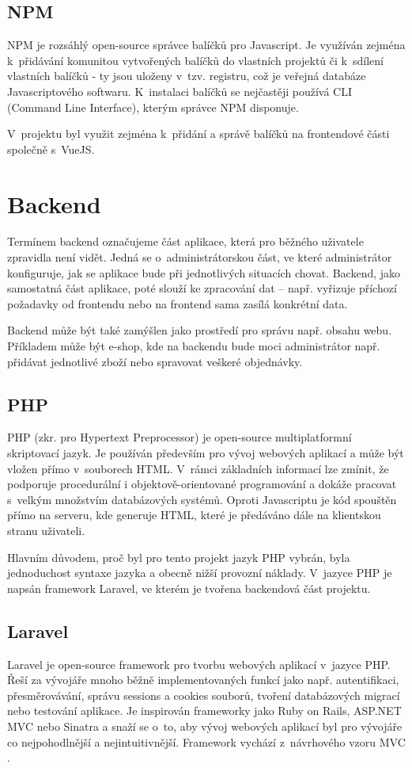 	\subsection{NPM}\label{sec:npm}
	NPM je rozsáhlý open-source správce balíčků pro Javascript. Je využíván zejména k~přidávání komunitou vytvořených balíčků do vlastních projektů či k~sdílení vlastních balíčků - ty jsou uloženy v~tzv. registru, což je veřejná databáze Javascriptového softwaru. K~instalaci balíčků se nejčastěji používá CLI (Command Line Interface), kterým správce NPM disponuje. \cite{NPM}
	
	V~projektu byl využit zejména k~přidání a správě balíčků na frontendové části společně s~VueJS.

\section{Backend}
Termínem backend označujeme část aplikace, která pro běžného uživatele zpravidla není vidět. Jedná se o~administrátorskou část, ve které administrátor konfiguruje, jak se aplikace bude při jednotlivých situacích chovat. Backend, jako samostatná část aplikace, poté slouží ke zpracování dat – např. vyřizuje příchozí požadavky od frontendu nebo na frontend sama zasílá konkrétní data.

Backend může být také zamýšlen jako prostředí pro správu např. obsahu webu. Příkladem může být e-shop, kde na backendu bude moci administrátor např. přidávat jednotlivé zboží nebo spravovat veškeré objednávky.  \cite{BE1}\cite{BE2}
	
	\subsection{PHP}
	PHP (zkr. pro Hypertext Preprocessor) je open-source multiplatformní skriptovací jazyk. Je používán především pro vývoj webových aplikací a může být vložen přímo v~souborech HTML. V~rámci základních informací lze zmínit, že podporuje procedurální i objektově-orientované programování a dokáže pracovat s~velkým množstvím databázových systémů. Oproti Javascriptu je kód spouštěn přímo na serveru, kde generuje HTML, které je předáváno dále na klientskou stranu uživateli. \cite{PHP1}\cite{PHP2}
	
	Hlavním důvodem, proč byl pro tento projekt jazyk PHP vybrán, byla jednoduchost syntaxe jazyka a obecně nižší provozní náklady. V~jazyce PHP je napsán framework Laravel, ve kterém je tvořena backendová část projektu.
	
	\subsection{Laravel}
	Laravel je open-source framework pro tvorbu webových aplikací v~jazyce PHP. Řeší za vývojáře mnoho běžně implementovaných funkcí jako např. autentifikaci, přesměrovávání, správu sessions a cookies souborů, tvoření databázových migrací nebo testování aplikace. Je inspirován frameworky jako Ruby on Rails, ASP.NET MVC nebo Sinatra a snaží se o~to, aby vývoj webových aplikací byl pro vývojáře co nejpohodlnější a nejintuitivnější. \cite{Laravel1} Framework vychází z~návrhového vzoru MVC \cite{LaravelMVC}.
	
